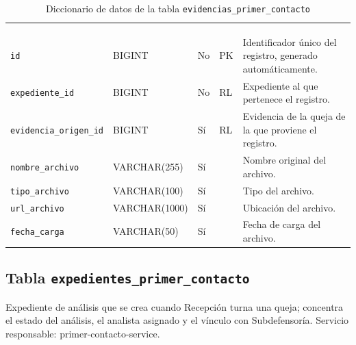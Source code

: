\footnotesize
\renewcommand{\arraystretch}{1.15}
\setlength{\tabcolsep}{4pt}
\begin{longtable}{|L{3.9cm}|L{2.4cm}|L{0.9cm}|L{1.2cm}|L{6.6cm}|}
	\hiderowcolors\caption{Diccionario de datos de la tabla \texttt{evidencias\_primer\_contacto}}
	\label{tab:dic_evidencias_primer_contacto} \\ \showrowcolors
	\hline
	 &  &  &  &  \\
	\hline
	\endfirsthead
	\hline
	 &  &  &  &  \\
	\hline
	\endhead
		\texttt{id} & BIGINT & No & PK & Identificador único del registro, generado automáticamente. \\ \hline
		\texttt{expediente\_\allowbreak{}id} & BIGINT & No & RL & Expediente al que pertenece el registro. \\ \hline
		\texttt{evidencia\_\allowbreak{}origen\_\allowbreak{}id} & BIGINT & Sí & RL & Evidencia de la queja de la que proviene el registro. \\ \hline
		\texttt{nombre\_\allowbreak{}archivo} & VARCHAR(255) & Sí &  & Nombre original del archivo. \\ \hline
		\texttt{tipo\_\allowbreak{}archivo} & VARCHAR(100) & Sí &  & Tipo del archivo. \\ \hline
		\texttt{url\_\allowbreak{}archivo} & VARCHAR(1000) & Sí &  & Ubicación del archivo. \\ \hline
		\texttt{fecha\_\allowbreak{}carga} & VARCHAR(50) & Sí &  & Fecha de carga del archivo. \\ \hline
\end{longtable}
\normalsize
\setlength{\tabcolsep}{6pt}
\renewcommand{\arraystretch}{1}

\subsection{Tabla \texttt{expedientes\_primer\_contacto}}
Expediente de análisis que se crea cuando Recepción turna una queja; concentra el estado del análisis, el analista asignado y el vínculo con Subdefensoría. Servicio responsable: primer-contacto-service.


